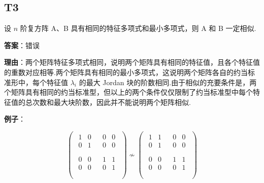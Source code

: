 \documentclass{article}
\begin{document}
\subsection{T3}

\par 设 $n$ 阶复方阵 A、B 具有相同的特征多项式和最小多项式，则 A 和 B 一定相似.

\par \textbf{答案}：错误

\par \textbf{理由}：两个矩阵特征多项式相同，说明两个矩阵具有相同的特征值，且各个特征值的重数对应相等.两个矩阵具有相同的最小多项式，这说明两个矩阵各自的约当标准形中，每个特征值 $\lambda_i$ 的最大 Jordan 块的阶数相同.由于相似的充要条件是，两个矩阵具有相同的约当标准型，但以上的两个条件仅仅限制了约当标准型中每个特征值的总次数和最大块阶数，因此并不能说明两个矩阵相似.

\par \textbf{例子}：

\begin{equation*}
	\begin{pmatrix}
		\begin{matrix}
			\boxed{1} & 0\\
			0 & \boxed{1}\\
		\end{matrix} &
		\begin{matrix}
			0 & 0\\
			0 & 0\\
		\end{matrix}\\
		\begin{matrix}
			0 & 0\\
			0 & 0\\
		\end{matrix} &
		\boxed{\begin{matrix}
				1 & 1\\
				0 & 1\\
		\end{matrix}}\\
	\end{pmatrix} \nsim
	\begin{pmatrix}
		\boxed{\begin{matrix}
				1 & 1\\
				0 & 1\\
		\end{matrix}}&
		\begin{matrix}
			0 & 0\\
			0 & 0\\
		\end{matrix}\\
		\begin{matrix}
			0 & 0\\
			0 & 0\\
		\end{matrix}&
		\boxed{\begin{matrix}
			1 & 1\\
			0 & 1\\
		\end{matrix}}\\
	\end{pmatrix}
\end{equation*}
\end{document}
